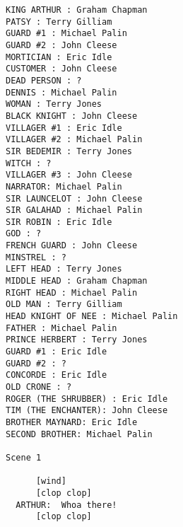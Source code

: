 \documentclass{article}
\begin{document}
\begin{verbatim}
KING ARTHUR : Graham Chapman
PATSY : Terry Gilliam
GUARD #1 : Michael Palin
GUARD #2 : John Cleese
MORTICIAN : Eric Idle
CUSTOMER : John Cleese
DEAD PERSON : ?
DENNIS : Michael Palin
WOMAN : Terry Jones
BLACK KNIGHT : John Cleese
VILLAGER #1 : Eric Idle
VILLAGER #2 : Michael Palin
SIR BEDEMIR : Terry Jones
WITCH : ?
VILLAGER #3 : John Cleese
NARRATOR: Michael Palin
SIR LAUNCELOT : John Cleese
SIR GALAHAD : Michael Palin
SIR ROBIN : Eric Idle
GOD : ?
FRENCH GUARD : John Cleese
MINSTREL : ?
LEFT HEAD : Terry Jones
MIDDLE HEAD : Graham Chapman
RIGHT HEAD : Michael Palin
OLD MAN : Terry Gilliam
HEAD KNIGHT OF NEE : Michael Palin
FATHER : Michael Palin
PRINCE HERBERT : Terry Jones
GUARD #1 : Eric Idle
GUARD #2 : ?
CONCORDE : Eric Idle
OLD CRONE : ?
ROGER (THE SHRUBBER) : Eric Idle
TIM (THE ENCHANTER): John Cleese
BROTHER MAYNARD: Eric Idle
SECOND BROTHER: Michael Palin

Scene 1

      [wind]
      [clop clop]
  ARTHUR:  Whoa there!
      [clop clop]


\end{verbatim}
\end{document}
